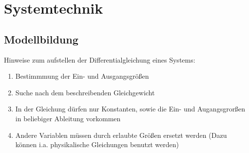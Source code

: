 \documentclass[10pt,a4paper]{article}
\begin{document}
  \section{Systemtechnik}
  \subsection{Modellbildung}
  Hinweise zum aufstellen der Differentialgleichung eines Systems:
  \begin{mdframed}[style=exercise]
  \begin{enumerate}
      \item Bestimmmung der Ein- und Ausgangsgrößen
      \item Suche nach dem beschreibenden Gleichgewicht
      \item In der Gleichung dürfen nur Konstanten, sowie die Ein- und
          Augangsgrorßen in beliebiger Ableitung vorkommen
      \item Andere Variablen müssen durch erlaubte Größen ersetzt werden (Dazu
          können i.a. physikalische Gleichungen benutzt werden)
    \end{enumerate}
\end{mdframed}
\end{document}
